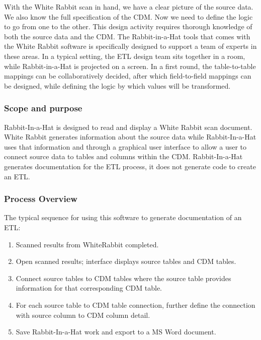 \documentclass[11pt]{book}
\providecommand{\tightlist}{%
  \setlength{\itemsep}{0pt}\setlength{\parskip}{0pt}}
\theoremstyle{definition}
\theoremstyle{definition}
\theoremstyle{definition}
\theoremstyle{remark}
\begin{document}
With the White Rabbit scan in hand, we have a clear picture of the source data. We also know the full specification of the CDM. Now we need to define the logic to go from one to the other. This design activity requires thorough knowledge of both the source data and the CDM. The Rabbit-in-a-Hat tools that comes with the White Rabbit software is specifically designed to support a team of experts in these areas. In a typical setting, the ETL design team sits together in a room, while Rabbit-in-a-Hat is projected on a screen. In a first round, the table-to-table mappings can be collaboratively decided, after which field-to-field mappings can be designed, while defining the logic by which values will be transformed.  

\hypertarget{scope-and-purpose-1}{%
\subsubsection*{Scope and purpose}\label{scope-and-purpose-1}}

Rabbit-In-a-Hat is designed to read and display a White Rabbit scan document. White Rabbit generates information about the source data while Rabbit-In-a-Hat uses that information and through a graphical user interface to allow a user to connect source data to tables and columns within the CDM. Rabbit-In-a-Hat generates documentation for the ETL process, it does not generate code to create an ETL.

\hypertarget{process-overview-1}{%
\subsubsection*{Process Overview}\label{process-overview-1}}

The typical sequence for using this software to generate documentation of an ETL:

\begin{enumerate}
\def\labelenumi{\arabic{enumi}.}
\tightlist
\item
  Scanned results from WhiteRabbit completed.
\item
  Open scanned results; interface displays source tables and CDM tables.
\item
  Connect source tables to CDM tables where the source table provides information for that corresponding CDM table.
\item
  For each source table to CDM table connection, further define the connection with source column to CDM column detail.
\item
  Save Rabbit-In-a-Hat work and export to a MS Word document.
\end{enumerate}
\end{document}
